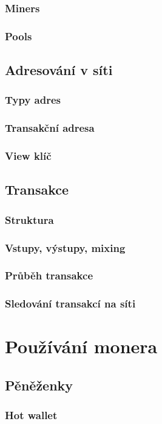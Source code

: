 \documentclass[
  printed, %
  table,   %
  nolof,     %
  nolot,     %
           oneside, color
]{fithesis3}
\begin{document}
\subsection{Miners}
\subsection{Pools}
\section{Adresování v síti}
\subsection{Typy adres}
\subsection{Transakční adresa}
\subsection{View klíč}
\section{Transakce}
\subsection{Struktura}
\subsection{Vstupy, výstupy, mixing}
\subsection{Průběh transakce}
\subsection{Sledování transakcí na síti}


\chapter{Používání monera}
\section{Pěněženky}
\subsection{Hot wallet}
\end{document}
